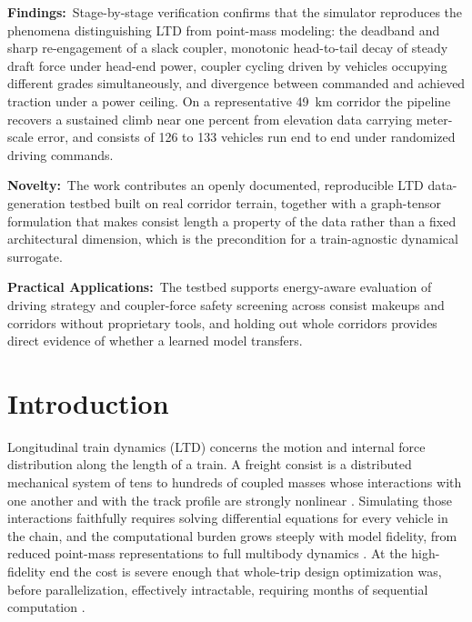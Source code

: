 \documentclass[numbered]{trbunofficial}
\begin{document}
\vspace{0.25\baselineskip}
\noindent\textbf{Findings:}~Stage-by-stage verification confirms that the simulator reproduces the phenomena distinguishing LTD from point-mass modeling: the deadband and sharp re-engagement of a slack coupler, monotonic head-to-tail decay of steady draft force under head-end power, coupler cycling driven by vehicles occupying different grades simultaneously, and divergence between commanded and achieved traction under a power ceiling. On a representative 49~km corridor the pipeline recovers a sustained climb near one percent from elevation data carrying meter-scale error, and consists of 126 to 133 vehicles run end to end under randomized driving commands.

\vspace{0.25\baselineskip}
\noindent\textbf{Novelty:}~The work contributes an openly documented, reproducible LTD data-generation testbed built on real corridor terrain, together with a graph-tensor formulation that makes consist length a property of the data rather than a fixed architectural dimension, which is the precondition for a train-agnostic dynamical surrogate.

\vspace{0.25\baselineskip}
\noindent\textbf{Practical Applications:}~The testbed supports energy-aware evaluation of driving strategy and coupler-force safety screening across consist makeups and corridors without proprietary tools, and holding out whole corridors provides direct evidence of whether a learned model transfers.

\newpage

\section{Introduction}\label{sec:intro}

Longitudinal train dynamics (LTD) concerns the motion and internal force distribution along the length of a train. A freight consist is a distributed mechanical system of tens to hundreds of coupled masses whose interactions with one another and with the track profile are strongly nonlinear \citep{Cole2006HandbookLTD}. Simulating those interactions faithfully requires solving differential equations for every vehicle in the chain, and the computational burden grows steeply with model fidelity, from reduced point-mass representations to full multibody dynamics \citep{Wu2016OverviewLTD}. At the high-fidelity end the cost is severe enough that whole-trip design optimization was, before parallelization, effectively intractable, requiring months of sequential computation \citep{wu2019highfidelity}.
\end{document}
